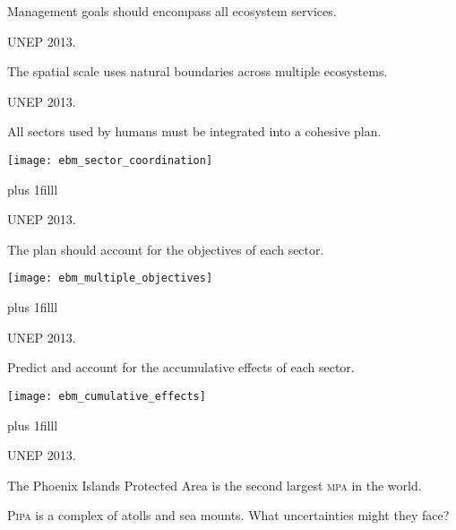 \documentclass[t]{beamer}
\begin{document}
%
{
\begin{frame}[b]{Management goals should encompass all ecosystem services.}


\tiny UNEP 2013.
\end{frame}
}

%
{
\begin{frame}[b]{The spatial scale uses natural boundaries across multiple ecosystems.}


\hfill\tiny UNEP 2013.
\end{frame}
}

%
\begin{frame}[t]{All sectors used by humans must be integrated into a cohesive plan.}

\texttt{[image: ebm\_sector\_coordination]}

\vskip0pt plus 1filll

\hfill\tiny UNEP 2013.
\end{frame}

%
\begin{frame}[t]{The plan should account for the objectives of each sector.}

\texttt{[image: ebm\_multiple\_objectives]}

\vskip0pt plus 1filll

\hfill\tiny UNEP 2013.
\end{frame}

%
\begin{frame}[t]{Predict and account for the accumulative effects of each sector.}

\texttt{[image: ebm\_cumulative\_effects]}

\vskip0pt plus 1filll

\hfill\tiny UNEP 2013.
\end{frame}

%
{
\begin{frame}[b]{The Phoenix Islands Protected Area is the second largest \textsc{mpa} in the world.}

\end{frame}
}

%
{
\begin{frame}[b]{P\textsc{ipa} is a complex of atolls and sea mounts. What uncertainties might they face?}

\end{frame}
}
\end{document}

